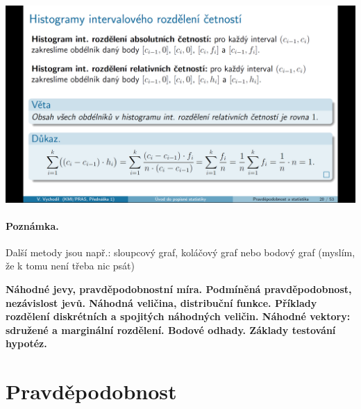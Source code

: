 \documentclass[12pt,a4paper]{article}
\begin{document}
\begin{center}
	\includegraphics[scale=0.32]{img/graficke_metody_intervalove_rozdeleni_histogramy}
\end{center}
\paragraph{Poznámka.} Další metody jsou např.: sloupcový graf, koláčový graf nebo bodový graf (myslím, že k tomu není třeba nic psát)

\newpage
\textbf{Náhodné jevy, pravděpodobnostní míra. Podmíněná pravděpodobnost, nezávislost jevů. Náhodná veličina, distribuční
funkce. Příklady rozdělení diskrétních a spojitých náhodných veličin. Náhodné vektory: sdružené a
marginální rozdělení. Bodové odhady. Základy testování hypotéz.}

\section{Pravděpodobnost}
\end{document}
